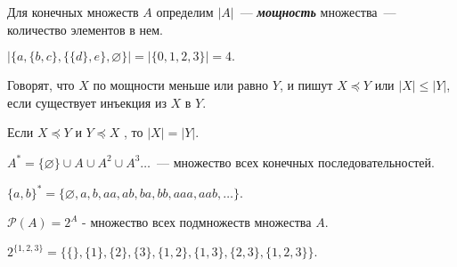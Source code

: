 \documentclass{article}
\begin{document}
    \begin{definition_boxed}
        Для конечных множеств $A$ определим $|A|$~--- \textit{\textbf{мощность}} множества~--- количество элементов в нем.
    \end{definition_boxed}

    \begin{example}
        $|\{a,\{b,c\},\{\{d\},e\},\varnothing\}| = |\{0,1,2,3\}| = 4.$
    \end{example}

    \begin{definition_boxed}
        Говорят, что $X$ по мощности меньше или равно $Y$, и пишут $X \preccurlyeq Y$ или $|X| \leqslant |Y|$, если существует инъекция из $X$ в $ Y $.
    \end{definition_boxed}

    \begin{theorem_boxed}
        Если $X \preccurlyeq Y$ и $Y \preccurlyeq X$ , то $|X| = |Y|$.
    \end{theorem_boxed}

    \begin{definition_boxed}
        $A^* = \{\varnothing\} \cup A \cup A^2 \cup A^3 \dotsc$~--- множество всех конечных последовательностей.
    \end{definition_boxed}

    \begin{example}
        $\{a,b\}^* = \{\varnothing, a,b,aa,ab,ba,bb,aaa,aab,\dotsc\}.$
    \end{example}

    \begin{definition_boxed}
        $\mathcal{P}(A) = 2^A$ - множество всех подмножеств множества $A$.
    \end{definition_boxed}

    \begin{example}
        $2^{\{1,2,3\}} = \{\{\}, \{1\},\{2\},\{3\},\{1,2\},\{1,3\},\{2,3\},\{1,2,3\}\}.$
    \end{example}
\end{document}
